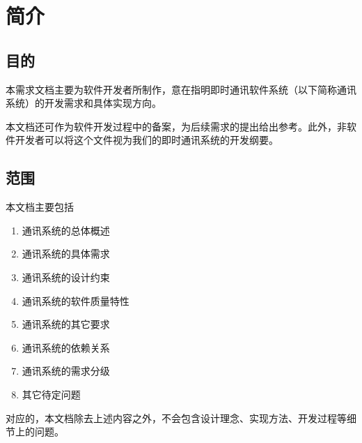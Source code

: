 \chapter{简介}
\section{目的}


本需求文档主要为软件开发者所制作，意在指明即时通讯软件系统（以下简称通讯系统）的开发需求和具体实现方向。

本文档还可作为软件开发过程中的备案，为后续需求的提出给出参考。此外，非软件开发者可以将这个文件视为我们的即时通讯系统的开发纲要。

\section{范围}


本文档主要包括
\begin{enumerate}
	\item 通讯系统的总体概述
	
	\item 通讯系统的具体需求
	
	\item 通讯系统的设计约束
	
	\item 通讯系统的软件质量特性
	
	\item 通讯系统的其它要求
	
	\item 通讯系统的依赖关系
	
	\item 通讯系统的需求分级
	
	\item 其它待定问题 
\end{enumerate}

对应的，本文档除去上述内容之外，不会包含设计理念、实现方法、开发过程等细节上的问题。
